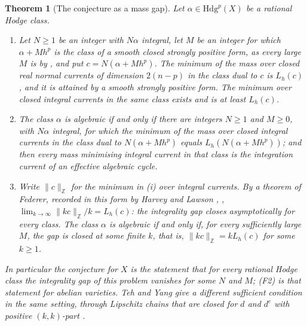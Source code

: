 \documentclass[11pt,reqno]{amsart}
\theoremstyle{plain}
\newtheorem{theorem}{Theorem}[section]
\theoremstyle{definition}
\theoremstyle{remark}
\newcommand{\ZZ}{\mathbb{Z}}
\newcommand{\Hdg}{\mathrm{Hdg}}
\begin{document}
\begin{theorem}[The conjecture as a mass gap]\label{thm:massgap}
Let $\alpha\in\Hdg^{p}(X)$ be a rational Hodge class.
\begin{enumerate}[label=\textup{(\roman*)},leftmargin=2.6em,itemsep=2pt]
\item Let $N\ge1$ be an integer with $N\alpha$ integral, let $M$ be an
  integer for which $\alpha+Mh^{p}$ is the class of a smooth closed strongly
  positive form, as every large $M$ is by , and
  put $c=N(\alpha+Mh^{p})$. The minimum of the mass over closed real normal
  currents of dimension $2(n-p)$ in the class dual to $c$ is $L_{h}(c)$, and
  it is attained by a smooth strongly positive form. The minimum over closed
  integral currents in the same class exists and is at least $L_{h}(c)$.
\item The class $\alpha$ is algebraic if and only if there are integers
  $N\ge1$ and $M\ge0$, with $N\alpha$ integral, for which the minimum of the
  mass over closed integral currents in the class dual to $N(\alpha+Mh^{p})$
  equals $L_{h}(N(\alpha+Mh^{p}))$; and then every mass minimising integral
  current in that class is the integration current of an effective algebraic
  cycle.
\item Write $\|c\|_{\ZZ}$ for the minimum in \textup{(i)} over integral
  currents. By a theorem of Federer, recorded in this form by Harvey and
  Lawson \cite[Section~6]{HL09}, \cite{Fed69,Fed74}, $\lim_{k\to\infty}
  \|kc\|_{\ZZ}/k=L_{h}(c)$: the integrality gap closes asymptotically for
  every class. The class $\alpha$ is algebraic if and only if, for every
  sufficiently large $M$, the gap is closed at some finite $k$, that is,
  $\|kc\|_{\ZZ}=kL_{h}(c)$ for some $k\ge1$.
\end{enumerate}
In particular the conjecture for $X$ is the statement that for every rational
Hodge class the integrality gap of this problem vanishes for some $N$ and $M$;
\textup{(F2)} is that statement for abelian varieties. Teh and Yang give a
different sufficient condition in the same setting, through Lipschitz chains
that are closed for $d$ and $d^{c}$ with positive $(k,k)$-part
\cite[Theorem~4.2]{TY21}.
\end{theorem}
\end{document}
